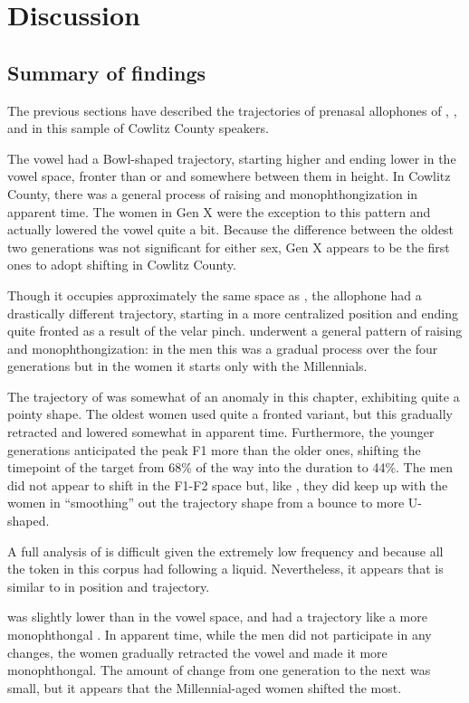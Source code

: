 \section{Discussion}
\label{sec:prenasal_discussion}

\subsection{Summary of findings}

The previous sections have described the trajectories of prenasal allophones of \trap, \dress, and \kit in this sample of Cowlitz County speakers.

The \ban vowel had a Bowl-shaped trajectory, starting higher and ending lower in the vowel space, fronter than \bat or \bet and somewhere between them in height. In Cowlitz County, there was a general process of raising and monophthongization in apparent time. The women in Gen X were the exception to this pattern and actually lowered the vowel quite a bit. Because the difference between the oldest two generations was not significant for either sex, Gen X appears to be the first ones to adopt \ban shifting in Cowlitz County.

Though it occupies approximately the same space as \ban, the \bang allophone had a drastically different trajectory, starting in a more centralized position and ending quite fronted as a result of the velar pinch. \bang underwent a general pattern of raising and monophthongization: in the men this was a gradual process over the four generations but in the women it starts only with the Millennials.

The trajectory of \ben was somewhat of an anomaly in this chapter, exhibiting quite a pointy shape. The oldest women used quite a fronted variant, but this gradually retracted and lowered somewhat in apparent time. Furthermore, the younger generations anticipated the peak F1 more than the older ones, shifting the timepoint of the target from 68\% of the way into the duration to 44\%. The men did not appear to shift \ben in the F1-F2 space but, like \bet, they did keep up with the women in ``smoothing'' out the trajectory shape from a bounce to more U-shaped.

A full analysis of \beng is difficult given the extremely low frequency and because all the token in this corpus had \beng following a liquid. Nevertheless, it appears that \beng is similar to \bang in position and trajectory.

\bin was slightly lower than \bit in the vowel space, and had a trajectory like a more monophthongal \ban. In apparent time, while the men did not participate in any changes, the women gradually retracted the vowel and made it more monophthongal. The amount of change from one generation to the next was small, but it appears that the Millennial-aged women shifted the most.

